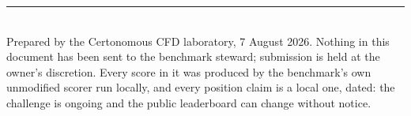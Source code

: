 \documentclass[11pt,a4paper]{article}
\begin{document}
\vfill
\noindent\rule{\textwidth}{0.4pt}\\
{\footnotesize Prepared by the Certonomous CFD laboratory, 7 August 2026. Nothing in this
document has been sent to the benchmark steward; submission is held at the owner's
discretion. Every score in it was produced by the benchmark's own unmodified scorer run
locally, and every position claim is a local one, dated: the challenge is ongoing and the
public leaderboard can change without notice.}
\end{document}
